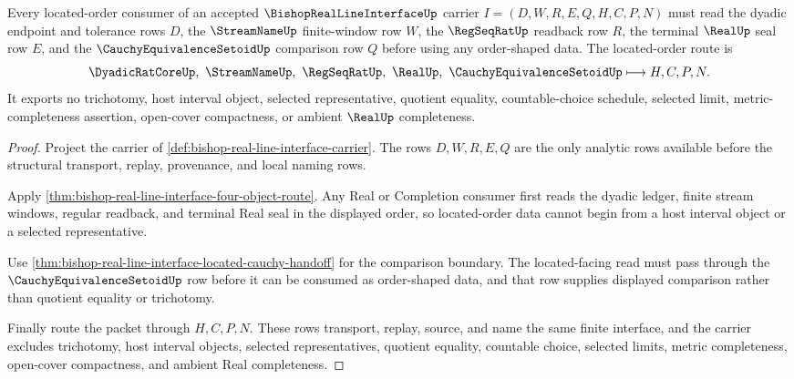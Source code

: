 \begin{theorem}
\label{thm:bishop-real-line-interface-located-order-route}
Every located-order consumer of an accepted $\BishopRealLineInterfaceUp$ carrier $I=(D,W,R,E,Q,H,C,P,N)$ must read the dyadic endpoint and tolerance rows $D$, the $\StreamNameUp$ finite-window row $W$, the $\RegSeqRatUp$ readback row $R$, the terminal $\RealUp$ seal row $E$, and the $\CauchyEquivalenceSetoidUp$ comparison row $Q$ before using any order-shaped data. The located-order route is
$$
\DyadicRatCoreUp,\ \StreamNameUp,\ \RegSeqRatUp,\ \RealUp,\ \CauchyEquivalenceSetoidUp
\longmapsto H,C,P,N .
$$
It exports no trichotomy, host interval object, selected representative, quotient equality, countable-choice schedule, selected limit, metric-completeness assertion, open-cover compactness, or ambient $\RealUp$ completeness.
\end{theorem}
\begin{proof}
Project the carrier of \autoref{def:bishop-real-line-interface-carrier}. The rows $D,W,R,E,Q$ are the only analytic rows available before the structural transport, replay, provenance, and local naming rows.

Apply \autoref{thm:bishop-real-line-interface-four-object-route}. Any Real or Completion consumer first reads the dyadic ledger, finite stream windows, regular readback, and terminal Real seal in the displayed order, so located-order data cannot begin from a host interval object or a selected representative.

Use \autoref{thm:bishop-real-line-interface-located-cauchy-handoff} for the comparison boundary. The located-facing read must pass through the $\CauchyEquivalenceSetoidUp$ row before it can be consumed as order-shaped data, and that row supplies displayed comparison rather than quotient equality or trichotomy.

Finally route the packet through $H,C,P,N$. These rows transport, replay, source, and name the same finite interface, and the carrier excludes trichotomy, host interval objects, selected representatives, quotient equality, countable choice, selected limits, metric completeness, open-cover compactness, and ambient Real completeness.
\end{proof}

